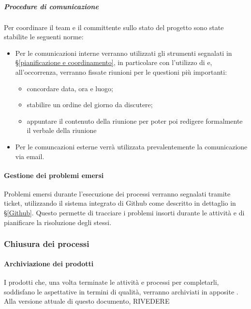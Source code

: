 			\subparagraph{Procedure di comunicazione}
			Per coordinare il team e il committente sullo stato del progetto sono state stabilite le seguenti norme:
			\begin{itemize}
				\item Per le comunicazioni interne verranno utilizzati gli strumenti segnalati in \S\ref{pianificazione e coordinamento}, in particolare
					con l'utilizzo di  e, all'occorrenza, verranno fissate riunioni per le questioni più importanti:
					\begin{itemize}
						\item concordare data, ora e luogo;
						\item stabilire un ordine del giorno da discutere;
						\item appuntare il contenuto della riunione per poter poi redigere formalmente il verbale della riunione
					\end{itemize}
				\item Per le comuncazioni esterne verrà utilizzata prevalentemente la comunicazione via email. %
			\end{itemize}


    		\paragraph{Gestione dei problemi emersi}
			Problemi emersi durante l'esecuzione dei processi verranno segnalati tramite ticket, utilizzando il sistema integrato di Github come descritto
			in dettaglio in \S\ref{Github}. Questo permette di tracciare i problemi insorti durante le attività e di pianificare la risoluzione degli stessi.


		\subsubsection{Chiusura dei processi}

    		\paragraph{Archiviazione dei prodotti}
			I prodotti che, una volta terminate le attività e processi per completarli, soddisfano le aspettative in termini di qualità,
			verranno archiviati in apposite . Alla versione attuale di questo documento, RIVEDERE

